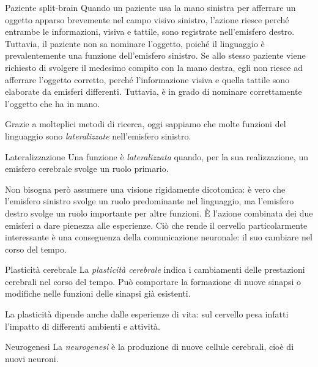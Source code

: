 \documentclass[a4paper]{article}
\begin{document}
\begin{snippetexample}{Paziente split-brain}
    Quando un paziente usa la mano sinistra per afferrare un oggetto apparso brevemente nel campo visivo sinistro, l'azione riesce perché entrambe le informazioni, visiva e tattile, sono registrate nell'emisfero destro. Tuttavia, il paziente non sa nominare l'oggetto, poiché il linguaggio è prevalentemente una funzione dell'emisfero sinistro. Se allo stesso paziente viene richiesto di svolgere il medesimo compito con la mano destra, egli non riesce ad afferrare l'oggetto corretto, perché l'informazione visiva e quella tattile sono elaborate da emisferi differenti. Tuttavia, è in grado di nominare correttamente l'oggetto che ha in mano.
\end{snippetexample}
Grazie a molteplici metodi di ricerca, oggi sappiamo che molte funzioni del linguaggio sono \emph{lateralizzate} nell'emisfero sinistro.
\begin{snippetdefinition}{Lateralizzazione}
    Una funzione è \emph{lateralizzata} quando, per la sua realizzazione, un emisfero cerebrale svolge un ruolo primario.
\end{snippetdefinition}
Non bisogna però assumere una visione rigidamente dicotomica: è vero che l'emisfero sinistro svolge un ruolo predominante nel linguaggio, ma l'emisfero destro svolge un ruolo importante per altre funzioni. È l'azione combinata dei due emisferi a dare pienezza alle esperienze.
Ciò che rende il cervello particolarmente interessante è una conseguenza della comunicazione neuronale: il suo cambiare nel corso del tempo.
\begin{snippetdefinition}{Plasticità cerebrale}
    La \emph{plasticità cerebrale} indica i cambiamenti delle prestazioni cerebrali nel corso del tempo. Può comportare la formazione di nuove sinapsi o modifiche nelle funzioni delle sinapsi già esistenti.
\end{snippetdefinition}
La plasticità dipende anche dalle esperienze di vita: sul cervello pesa infatti l'impatto di differenti ambienti e attività.
\begin{snippetdefinition}{Neurogenesi}
    La \emph{neurogenesi} è la produzione di nuove cellule cerebrali, cioè di nuovi neuroni.
\end{snippetdefinition}
\end{document}
